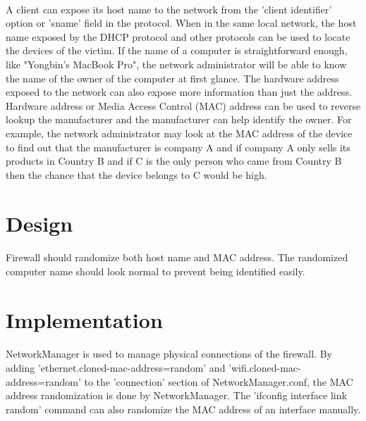 \documentclass[mscthesis]{usiinfthesis}
\begin{document}
\paragraph{}
A client can expose its host name to the network from the 'client identifier' option or 'sname' field in the protocol. When in the same local network, the host name exposed by the DHCP protocol and other protocols can be used to locate the devices of the victim. If the name of a computer is straightforward enough, like "Yongbin's MacBook Pro", the network administrator will be able to know the name of the owner of the computer at first glance. The hardware address exposed to the network can also expose more information than just the address. Hardware address or Media Access Control (MAC) address can be used to reverse lookup the manufacturer and the manufacturer can help identify the owner. For example, the network administrator may look at the MAC address of the device to find out that the manufacturer is company A and if company A only sells its products in Country B and if C is the only person who came from Country B then the chance that the device belongs to C would be high.

\section{Design}
\paragraph{}
Firewall should randomize both host name and MAC address. The randomized computer name should look normal to prevent being identified easily.


\section{Implementation}
\paragraph{}
NetworkManager is used to manage physical connections of the firewall. By adding 'ethernet.cloned-mac-address=random' and 'wifi.cloned-mac-address=random' to the 'connection' section of NetworkManager.conf, the MAC address randomization is done by NetworkManager. The 'ifconfig interface link random' command can also randomize the MAC address of an interface manually.
\end{document}
